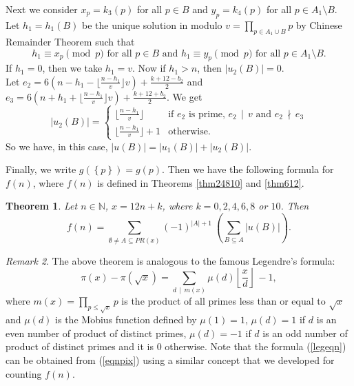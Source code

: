 \documentclass[11pt]{article}
\newtheorem{theorem}{Theorem}[section]
\theoremstyle{definition}
\theoremstyle{remark}
\newtheorem{remark}[theorem]{Remark}
\numberwithin{equation}{section}
\newcommand{\Nat}{\mathbb{N}}
\newcommand{\set}[1]{\left\{#1\right\}}
\newcommand{\Mod}[3]{#1\equiv #2 \pmod{#3}}
\newcommand{\Div}[2]{#1\,\mid\, #2}
\newcommand{\nDiv}[2]{#1\,\nmid\, #2}
\begin{document}
\vspace{1em}
\noindent
Next we consider $x_p=k_3(p)$ for all $p\in B$ and $y_p=k_4(p)$ for all $p\in A_1\setminus B$. Let $h_1=h_1(B)$ be the unique solution in modulo $v=\prod\limits_{p\in A_1\cup B} p$ by Chinese Remainder Theorem such that 
$$\Mod{h_1}{x_p}{p} \text{ for all } p\in B \text{ and }\Mod{h_1}{y_p}{p} \text{ for all }p\in A_1\setminus B.$$ 
If $h_1=0$, then we take $h_1=v$. Now if $h_1>n$, then $|u_2(B)|=0$.\\
 Let $e_2=6(n-h_1-\lfloor\frac{n-h_1}{v}\rfloor v)+\frac{k+12-b_2}{2}$ and $e_3=6(n+h_1+\lfloor\frac{n-h_1}{v}\rfloor v)+\frac{k+12+b_2}{2}$. We get 
\begin{equation}\label{formub2}
|u_2(B)|=\left\{
\begin{array}{ll}
\lfloor\frac{n-h_1}{v}\rfloor & \text{if } e_2 \text{ is prime, } \Div{e_2}{v} \text{ and }\nDiv{e_2}{e_3}\\
\lfloor\frac{n-h_1}{v}\rfloor +1 & \text{otherwise}.
\end{array}\right.
\end{equation}
So we have, in this case, $|u(B)|=|u_1(B)|+|u_2(B)|$. 

\vspace{1em}
\noindent
Finally, we write $g(\set{p})=g(p)$. Then we have the following formula for $f(n)$, where $f(n)$ is defined in Theorems \ref{thm24810} and \ref{thm612}.

\begin{theorem}\label{thcompfn}
Let $n\in\Nat$, $x=12n+k$, where $k=0,2,4,6,8$ or $10$. Then 
$$f(n)=\sum\limits_{\emptyset\neq A\subseteq PR(x)} (-1)^{|A|+1}\ \left(\sum\limits_{B\subseteq A} |u(B)|\right).$$
\end{theorem}

\vspace{1em}
\begin{remark}
The above theorem is analogous to the famous Legendre's formula:
\begin{equation}\label{legeqn}
\pi(x)-\pi(\sqrt{x})=\sum\limits_{\Div{d}{m(x)}} \mu(d) \left\lfloor \frac{x}{d}\right\rfloor\, -1,
\end{equation}
where $m(x)=\prod\limits_{p\leq \sqrt{x}} p$ is the product of all primes less than or equal to $\sqrt{x}$ and $\mu(d)$ is the M$\ddot{\text{o}}$bius function defined by $\mu(1)=1$, $\mu(d)=1$ if $d$ is an even number of product of distinct primes, $\mu(d)=-1$ if $d$ is an odd number of product of distinct primes and it is $0$ otherwise. Note that the formula (\ref{legeqn}) can be obtained from (\ref{eqnpix}) using a similar concept that we developed for counting $f(n)$.
\end{remark}
\end{document}
